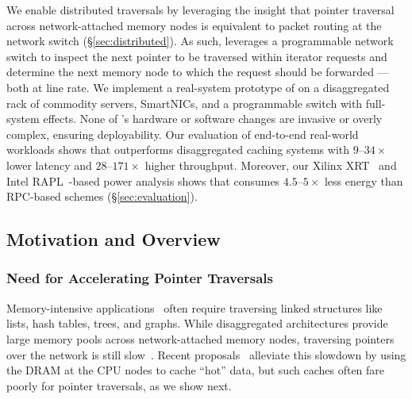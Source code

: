 We enable distributed traversals by leveraging the insight that pointer traversal across network-attached memory nodes is equivalent to packet routing at the network switch (\S\ref{sec:distributed}). As such, \pulse leverages a programmable network switch to inspect the next pointer to be traversed within iterator requests and determine the next memory node to which the request should be forwarded --- both at line rate. We implement a real-system prototype of \pulse on a disaggregated rack of commodity servers, SmartNICs, and a programmable switch with full-system effects. None of \pulse's hardware or software changes are invasive or overly complex, ensuring deployability.  Our evaluation of end-to-end real-world workloads shows that \pulse outperforms disaggregated caching systems with $9$--$34\times$ lower latency and $28$--$171\times$ higher throughput. Moreover, our Xilinx XRT~\cite{xilinx_xrt} and Intel RAPL~\cite{intel_rapl}-based power analysis shows that \pulse consumes $4.5$--$5\times$ less energy than RPC-based schemes (\S\ref{sec:evaluation}).

\subsection{Motivation and \pulse Overview}
\label{sec:overview}

\subsubsection{Need for Accelerating Pointer Traversals}
\label{ssec:need}

Memory-intensive applications~\cite{scuba, cachelib, tao, memcache, flighttracker, twittercache, spark} often require traversing linked structures like lists, hash tables, trees, and graphs. 
While disaggregated architectures provide large memory pools across network-attached memory nodes, traversing pointers over the network is still slow~\cite{disagg}. Recent proposals~\cite{disagg, legoos, mind, infiniswap, fastswap} alleviate this slowdown by using the DRAM at the CPU nodes to cache ``hot'' data, but such caches often fare poorly for pointer traversals, as we show next. 

